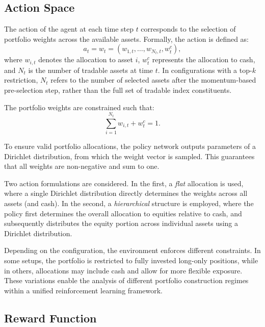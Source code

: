 \documentclass[]{elsarticle}
\begin{document}
\hypertarget{Action_Space}{%
\subsection{Action Space}\label{Action_Space}}

The action of the agent at each time step \(t\) corresponds to the selection of portfolio weights across the available assets. Formally, the action is defined as:
\begin{equation}
a_t = w_t = (w_{1,t}, \dots, w_{N_t,t}, w^c_t),
\end{equation}
where \(w_{i,t}\) denotes the allocation to asset \(i\), \(w^c_t\) represents the allocation to cash, and \(N_t\) is the number of tradable assets at time \(t\). In configurations with a top-\(k\) restriction, \(N_t\) refers to the number of selected assets after the momentum-based pre-selection step, rather than the full set of tradable index constituents.

The portfolio weights are constrained such that:
\begin{equation}
\sum_{i=1}^{N_t} w_{i,t} + w^c_t = 1.
\end{equation}

To ensure valid portfolio allocations, the policy network outputs parameters of a Dirichlet distribution, from which the weight vector is sampled. This guarantees that all weights are non-negative and sum to one.

Two action formulations are considered. In the first, a \textit{flat} allocation is used, where a single Dirichlet distribution directly determines the weights across all assets (and cash). In the second, a \textit{hierarchical} structure is employed, where the policy first determines the overall allocation to equities relative to cash, and subsequently distributes the equity portion across individual assets using a Dirichlet distribution.

Depending on the configuration, the environment enforces different constraints. In some setups, the portfolio is restricted to fully invested long-only positions, while in others, allocations may include cash and allow for more flexible exposure. These variations enable the analysis of different portfolio construction regimes within a unified reinforcement learning framework.

\hypertarget{Reward_Function}{%
\subsection{Reward Function}\label{Reward_Function}}
\end{document}
